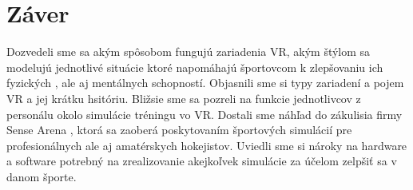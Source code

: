 \documentclass[10pt,twoside,slovak,a4paper]{article}										%
\begin{document}
\section{Záver} \label{zaver}
Dozvedeli sme sa akým spôsobom fungujú zariadenia VR, akým štýlom sa modelujú jednotlivé situácie ktoré napomáhajú športovcom k zlepšovaniu ich fyzických , ale aj mentálnych schopností. Objasnili sme si typy zariadení a pojem VR a jej krátku hsitóriu. Bližsie sme sa pozreli na funkcie jednotlivcov z personálu okolo simulácie tréningu vo VR. Dostali sme náhľad do zákulisia firmy Sense Arena , ktorá sa zaoberá poskytovaním športových simulácií pre profesionálnych ale aj amatérskych hokejistov. Uviedli sme si nároky na hardware a software potrebný na zrealizovanie akejkoľvek simulácie za účelom zelpšiť sa v danom športe.

 
\end{document}
